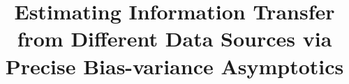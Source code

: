 \documentclass{article}
\newcommand*\samethanks[1][\value{footnote}]{\footnotemark[#1]}
\begin{document}
	\title{Estimating Information Transfer from Different Data Sources via Precise Bias-variance Asymptotics}
	\iffalse
	\vspace{0.15in}
	\author[1]{Hongyang R. Zhang\thanks{HZ and FY contributed equally to the theoretical results. SW conducted the experimental analysis. Correspondence to hrzhang@northeastern.edu or fyang75@wharton.upenn.edu.}}
	\author[2]{Fan Yang\samethanks}
	\author[3]{Sen Wu\samethanks}
	\author[2]{Weijie J. Su}
	\author[3]{Christopher R\'e}
	\vspace{0.15in}
	\affil[1]{Khoury College of Computer Sciences, Northeastern University}
	\affil[2]{Department of Statistics, The Wharton School, University of Pennsylvania}
	\affil[3]{Department of Computer Science, Stanford University}
	\fi

	\maketitle
	
	
	
	
    
	
	
	
	
\end{document}
